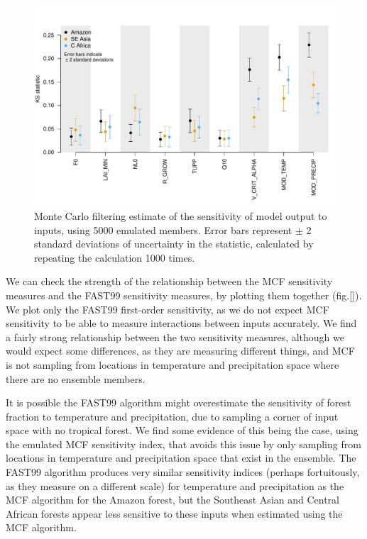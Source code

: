 \documentclass[gmd, manuscript]{copernicus}
\begin{document}
\begin{figure}[t]
\includegraphics[width=12cm]{../graphics/mcf.pdf}
\caption{Monte Carlo filtering estimate of the sensitivity of model output to inputs, using 5000 emulated members. Error bars represent $\pm$ 2 standard deviations of uncertainty in the statistic, calculated by repeating the calculation 1000 times.
}
\label{fig:mcf}
\end{figure}

We can check the strength of the relationship between the MCF sensitivity measures and the FAST99 sensitivity measures, by plotting them together (fig.\ref{}). We plot only the FAST99 first-order sensitivity, as we do not expect MCF sensitivity to be able to measure interactions between inputs accurately. We find a fairly strong relationship between the two sensitivity measures, although we would expect some differences, as they are measuring different things, and MCF is not sampling from locations in temperature and precipitation space where there are no ensemble members.

It is possible the FAST99 algorithm might overestimate the sensitivity of forest fraction to temperature and precipitation, due to sampling a corner of input space with no tropical forest. We find some evidence of this being the case, using the emulated MCF sensitivity index, that avoids this issue by only sampling from locations in temperature and precipitation space that exist in the ensemble. The FAST99 algorithm produces very similar sensitivity indices (perhaps fortuitously, as they measure on a different scale) for temperature and precipitation as the MCF algorithm for the Amazon forest, but the Southeast Asian and Central African forests appear less sensitive to these inputs when estimated using the MCF algorithm.
\end{document}
